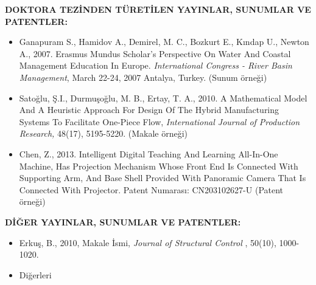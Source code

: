 \textbf{DOKTORA TEZİNDEN TÜRETİLEN YAYINLAR, SUNUMLAR VE PATENTLER:}\vspace{-3mm}
\begin{itemize}
	\item Ganapuram S., Hamidov A., Demirel, M. C., Bozkurt E., Kındap U., Newton
A., 2007. Erasmus Mundus Scholar's Perspective On Water And Coastal
Management Education In Europe. \textit{International Congress - River
Basin Management}, March 22-24, 2007 Antalya, Turkey. (Sunum örneği)
	\item Satoğlu, Ş.I., Durmuşoğlu, M. B., Ertay, T. A., 2010. A Mathematical
Model And A Heuristic Approach For Design Of The Hybrid Manufacturing
Systems To Facilitate One-Piece Flow, \textit{International Journal
of Production Research,} 48(17), 5195-5220. (Makale örneği)
	\item Chen, Z., 2013. Intelligent Digital Teaching And Learning All-In-One
Machine, Has Projection Mechanism Whose Front End Is Connected With
Supporting Arm, And Base Shell Provided With Panoramic Camera That
Is Connected With Projector. Patent Numarası: CN203102627-U (Patent
örneği) 
\end{itemize}
\newpage{}

\textbf{DİĞER YAYINLAR, SUNUMLAR VE PATENTLER:} \vspace{-3mm}
\begin{itemize}
	\item Erkuş, B., 2010, Makale İsmi, \textit{Journal of Structural Control}
, 50(10), 1000-1020.
	\item Diğerleri 
\end{itemize}
